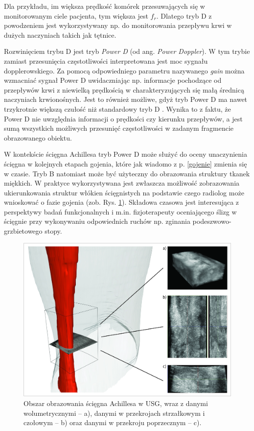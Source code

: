 Dla przykładu, im większa prędkość komórek przesuwających się w monitorowanym ciele pacjenta, tym większa jest $f_r$. Dlatego tryb D z powodzeniem jest wykorzystywany np. do monitorowania przepływu krwi w dużych naczyniach takich jak tętnice.

Rozwinięciem trybu D jest tryb \textit{Power D} (od ang. \textit{Power Doppler}). W tym trybie zamiast przesunięcia częstotliwości interpretowana jest moc sygnału dopplerowskiego. Za pomocą odpowiedniego parametru nazywanego \textit{gain} można wzmacniać sygnał Power D uwidaczniając np. informacje pochodzące od przepływów krwi z niewielką prędkością w charakteryzujących się małą średnicą naczyniach krwionośnych. Jest to również możliwe, gdyż tryb Power D ma nawet trzykrotnie większą czułość niż standardowy tryb D \cite{Babcock1996}. Wynika to z faktu, że Power D nie uwzględnia informacji o prędkości czy kierunku przepływów, a jest sumą wszystkich możliwych przesunięć częstotliwości w zadanym fragmencie obrazowanego obiektu.

W kontekście ścięgna Achillesa tryb Power D może służyć do oceny unaczynienia ścięgna w kolejnych etapach gojenia, które jak wiadomo z p. \ref{gojenie} zmienia się w czasie. Tryb B natomiast może być użyteczny do obrazowania struktury tkanek miękkich. W praktyce wykorzystywana jest zwłaszcza możliwość zobrazowania ukierunkowania struktur włókien ścięgnistych na podstawie czego radiolog może wnioskować o fazie gojenia (zob. Rys. \ref{usgAchillesComp}). Składowa czasowa jest interesująca z perspektywy badań funkcjonalnych i m.in. fizjoterapeuty oceniającego ślizg w ścięgnie przy wykonywaniu odpowiednich ruchów np. zginania podeszwowo-grzbietowego stopy. 

\begin{figure}[h!]
	\centering
	\includegraphics[width=1\textwidth]{figures/sciegnoUSG.jpg}
	\caption{Obszar obrazowania ścięgna Achillesa w USG, wraz z danymi wolumetrycznymi -- a), danymi w przekrojach strzałkowym i czołowym -- b) oraz danymi w przekroju poprzecznym -- c).}
	\label{usgAchillesComp}
\end{figure}


